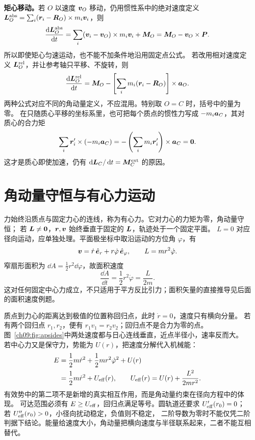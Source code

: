 {\textbf{矩心移动。}若 $O$ 以速度 $\bm{v}_O$ 移动，仍用惯性系中的绝对速度定义
$\bm{L}_O^{\rm abs}=\sum_i(\bm{r}_i-\bm{R}_O)\times m_i\bm{v}_i$，则
\begin{equation}
 \frac{\mathop{}\!\mathrm d\bm{L}_O^{\rm abs}}{\mathop{}\!\mathrm d t}
 =\sum_i(\bm{v}_i-\bm{v}_O)\times m_i\bm{v}_i+\bm{M}_O
 =\bm{M}_O-\bm{v}_O\times\bm{P}.
\end{equation}
所以即使矩心匀速运动，也不能不加条件地沿用固定点公式。
若改用相对速度定义 $\bm{L}_O^{\rm rel}$，并让参考轴只平移、不旋转，则
\begin{equation}
 \frac{\mathop{}\!\mathrm d\bm{L}_O^{\rm rel}}{\mathop{}\!\mathrm d t}
 =\bm{M}_O-\left[\sum_i m_i(\bm{r}_i-\bm{R}_O)\right]\times\bm{a}_O.
\end{equation}
两种公式对应不同的角动量定义，不应混用。特别取 $O=C$ 时，括号中的量为零。
在只随质心平移的坐标系里，也可把每个质点的惯性力写成 $-m_i\bm{a}_C$，其对质心的合力矩
\begin{equation}
 \sum_i\bm{r}_i'\times(-m_i\bm{a}_C)
 =-\left(\sum_i m_i\bm{r}_i'\right)\times\bm{a}_C=\bm{0}.
\end{equation}
这才是质心即使加速，仍有 $\mathop{}\!\mathrm d\bm{L}_C/\mathop{}\!\mathrm d t=\bm{M}_C^{\rm ext}$ 的原因。

\section{角动量守恒与有心力运动}
力始终沿质点与固定力心的连线，称为有心力。它对力心的力矩为零，角动量守恒；
若 $\bm{L}\ne\bm{0}$，$\bm{r},\bm{v}$ 始终垂直于固定的 $\bm{L}$，轨迹处于一个固定平面。
$L=0$ 对应径向运动，应单独处理。平面极坐标中取沿运动的方位角 $\varphi$，有
\begin{equation}
 \bm{v}=\dot r\,\hat{\bm{e}}_r+r\dot\varphi\,\hat{\bm{e}}_\varphi,
 \qquad L=mr^2\dot\varphi.
\end{equation}
窄扇形面积为 $\dd A=\tfrac12r^2\dd\varphi$，故面积速度
\begin{equation}
 \frac{\dd A}{\dd t}=\frac12r^2\dot\varphi=\frac{L}{2m}.
\end{equation}
这对任何固定中心力成立，不只适用于平方反比引力；面积矢量的直接推导见后面的面积速度例题。

质点到力心的距离达到极值的位置称回归点，此时 $\dot r=0$，速度只有横向分量。
若有两个回归点 $r_1,r_2$，便有 $r_1v_1=r_2v_2$；回归点不是合力为零的点。
图~\ref{ch09:fig:apsides}中两处速度都与日心连线垂直，近点半径小，速率反而大。
\apsidesDiagram
若中心力又是保守力，势能为 $U(r)$，把速度分解代入机械能：
\begin{align}
 E&=\frac12m\dot r^2+\frac12mr^2\dot\varphi^2+U(r)\\
 &=\frac12m\dot r^2+U_{\rm eff}(r),
 \qquad U_{\rm eff}(r)=U(r)+\frac{L^2}{2mr^2}.
\end{align}
有效势中的第二项不是新增的真实相互作用，而是角动量约束在径向方程中的体现。
可达范围必须有 $E\ge U_{\rm eff}$，回归点满足等号。圆轨道还要求
$U'_{\rm eff}(r_0)=0$；若 $U''_{\rm eff}(r_0)>0$，小径向扰动稳定，负值则不稳定，
二阶导数为零时不能仅凭二阶判据下结论。能量给速度大小，角动量把横向速度与半径联系起来，二者不能互相替代。

}
